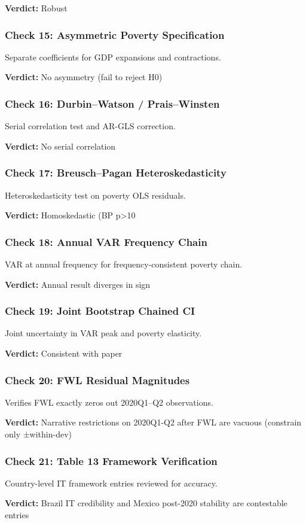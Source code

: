 \textbf{Verdict:} Robust


\subsubsection{Check 15: Asymmetric Poverty Specification}
Separate coefficients for GDP expansions and contractions.

\textbf{Verdict:} No asymmetry (fail to reject H0)


\subsubsection{Check 16: Durbin--Watson / Prais--Winsten}
Serial correlation test and AR-GLS correction.

\textbf{Verdict:} No serial correlation


\subsubsection{Check 17: Breusch--Pagan Heteroskedasticity}
Heteroskedasticity test on poverty OLS residuals.

\textbf{Verdict:} Homoskedastic (BP p>10%


\subsubsection{Check 18: Annual VAR Frequency Chain}
VAR at annual frequency for frequency-consistent poverty chain.

\textbf{Verdict:} Annual result diverges in sign


\subsubsection{Check 19: Joint Bootstrap Chained CI}
Joint uncertainty in VAR peak and poverty elasticity.

\textbf{Verdict:} Consistent with paper


\subsubsection{Check 20: FWL Residual Magnitudes}
Verifies FWL exactly zeros out 2020Q1--Q2 observations.

\textbf{Verdict:} Narrative restrictions on 2020Q1-Q2 after FWL are vacuous (constrain only ±within-dev)


\subsubsection{Check 21: Table 13 Framework Verification}
Country-level IT framework entries reviewed for accuracy.

\textbf{Verdict:} Brazil IT credibility and Mexico post-2020 stability are contestable entries

